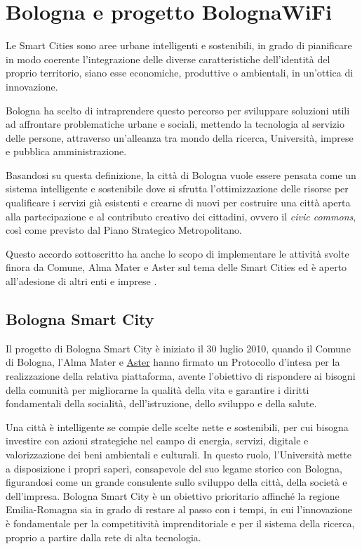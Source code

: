 

\section{Bologna e progetto BolognaWiFi}  %
Le Smart Cities sono aree urbane intelligenti e sostenibili, in grado di pianificare in modo coerente l'integrazione delle diverse caratteristiche dell'identità del proprio territorio, siano esse economiche, produttive o ambientali, in un'ottica di innovazione.

Bologna ha scelto di intraprendere questo percorso per sviluppare soluzioni utili ad affrontare problematiche urbane e sociali, mettendo la tecnologia al servizio delle persone, attraverso un'alleanza tra mondo della ricerca, Università, imprese e pubblica amministrazione.

Basandosi su questa definizione, la città di Bologna vuole essere pensata come un sistema intelligente e sostenibile dove si sfrutta l'ottimizzazione delle risorse per qualificare i servizi già esistenti e crearne di nuovi per costruire una città aperta alla partecipazione e al contributo creativo dei cittadini, ovvero il \textit{civic commons}, così come previsto dal Piano Strategico Metropolitano.

Questo accordo sottoscritto ha anche lo scopo di implementare le attività svolte finora da Comune, Alma Mater e Aster sul tema delle Smart Cities ed è aperto all'adesione di altri enti e imprese \cite{Bologna_Smart_City}.

\subsection{Bologna Smart City}
Il progetto di Bologna Smart City è iniziato il 30 luglio 2010, quando il Comune di Bologna, l'Alma Mater e \href{https://www.aster.it/}{Aster} hanno firmato un Protocollo d'intesa per la realizzazione della relativa piattaforma, avente l'obiettivo di rispondere ai bisogni della comunità per migliorarne la qualità della vita e garantire i diritti fondamentali della socialità, dell'istruzione, dello sviluppo e della salute.

Una città è intelligente se compie delle scelte nette e sostenibili, per cui bisogna investire con azioni strategiche nel campo di energia, servizi, digitale e valorizzazione dei beni ambientali e culturali. In questo ruolo, l'Università mette a disposizione i propri saperi, consapevole del suo legame storico con Bologna, figurandosi come un grande consulente sullo sviluppo della città, della società e dell'impresa. Bologna Smart City è un obiettivo prioritario affinché la regione Emilia-Romagna sia in grado di restare al passo con i tempi, in cui l'innovazione è fondamentale per la competitività imprenditoriale e per il sistema della ricerca, proprio a partire dalla rete di alta tecnologia.

